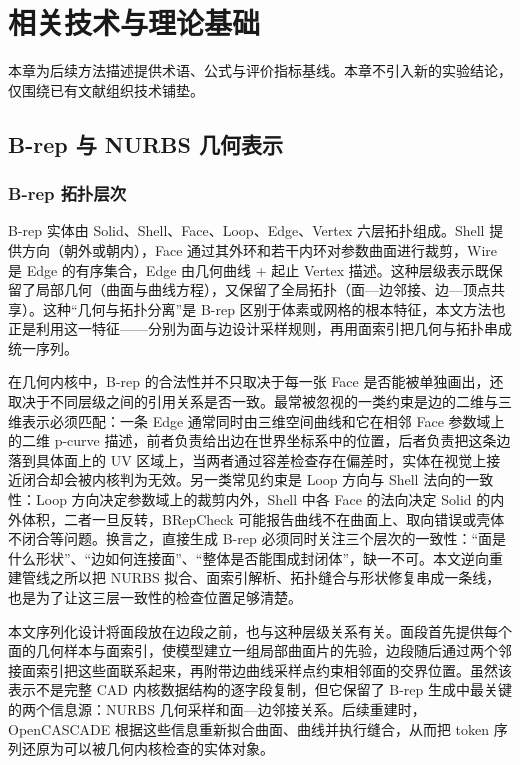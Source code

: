 
\chapter{相关技术与理论基础}

本章为后续方法描述提供术语、公式与评价指标基线。本章不引入新的实验结论，仅围绕已有文献组织技术铺垫。

\section{B-rep 与 NURBS 几何表示}

\subsection{B-rep 拓扑层次}

B-rep 实体由 Solid、Shell、Face、Loop、Edge、Vertex 六层拓扑组成。Shell 提供方向（朝外或朝内），Face 通过其外环和若干内环对参数曲面进行裁剪，Wire 是 Edge 的有序集合，Edge 由几何曲线 + 起止 Vertex 描述。这种层级表示既保留了局部几何（曲面与曲线方程），又保留了全局拓扑（面—边邻接、边—顶点共享）\cite{mantyla_1988_solid_modeling,hoffmann_1989_geometric_solid_modeling,piegl_tiller_1997_nurbs}。这种“几何与拓扑分离”是 B-rep 区别于体素或网格的根本特征，本文方法也正是利用这一特征——分别为面与边设计采样规则，再用面索引把几何与拓扑串成统一序列。

在几何内核中，B-rep 的合法性并不只取决于每一张 Face 是否能被单独画出，还取决于不同层级之间的引用关系是否一致。最常被忽视的一类约束是边的二维与三维表示必须匹配：一条 Edge 通常同时由三维空间曲线和它在相邻 Face 参数域上的二维 p-curve 描述，前者负责给出边在世界坐标系中的位置，后者负责把这条边落到具体面上的 UV 区域上，当两者通过容差检查存在偏差时，实体在视觉上接近闭合却会被内核判为无效。另一类常见约束是 Loop 方向与 Shell 法向的一致性：Loop 方向决定参数域上的裁剪内外，Shell 中各 Face 的法向决定 Solid 的内外体积，二者一旦反转，BRepCheck 可能报告曲线不在曲面上、取向错误或壳体不闭合等问题。换言之，直接生成 B-rep 必须同时关注三个层次的一致性：“面是什么形状”、“边如何连接面”、“整体是否能围成封闭体”，缺一不可。本文逆向重建管线之所以把 NURBS 拟合、面索引解析、拓扑缝合与形状修复串成一条线，也是为了让这三层一致性的检查位置足够清楚。

本文序列化设计将面段放在边段之前，也与这种层级关系有关。面段首先提供每个面的几何样本与面索引，使模型建立一组局部曲面片的先验，边段随后通过两个邻接面索引把这些面联系起来，再附带边曲线采样点约束相邻面的交界位置。虽然该表示不是完整 CAD 内核数据结构的逐字段复制，但它保留了 B-rep 生成中最关键的两个信息源：NURBS 几何采样和面—边邻接关系。后续重建时，OpenCASCADE 根据这些信息重新拟合曲面、曲线并执行缝合，从而把 token 序列还原为可以被几何内核检查的实体对象。

